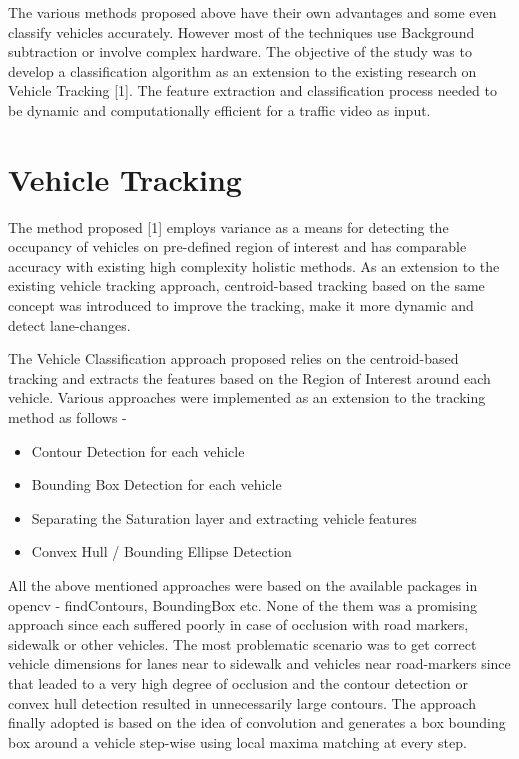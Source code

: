 \documentclass[a4paper,12pt]{article}
\begin{document}
\begin{flushleft}
	The various methods proposed above have their own advantages and some even classify vehicles accurately. However most of the techniques use Background subtraction or involve complex hardware. The objective of the study was to develop a classification algorithm as an extension to the existing research on Vehicle Tracking [1]. The feature extraction and classification process needed to be dynamic and computationally efficient for a traffic video as input.
\end{flushleft}


\newpage
\section{Vehicle Tracking}

\vspace{0.1in}
The method proposed [1] employs variance as a means for detecting the occupancy of vehicles on pre-defined region of interest and has comparable accuracy with existing high complexity holistic methods. As an extension to the existing vehicle tracking approach, centroid-based tracking based on the same concept was introduced to improve the tracking, make it more dynamic and detect lane-changes.

\vspace{0.1in}
\begin{flushleft}
The Vehicle Classification approach proposed relies on the centroid-based tracking and extracts the features based on the Region of Interest around each vehicle. Various approaches were implemented as an extension to the tracking method as follows - 
\end{flushleft}

\begin{itemize}
\setlength{\itemindent}{.2in}
\item Contour Detection for each vehicle
\item Bounding Box Detection for each vehicle
\item Separating the Saturation layer and extracting vehicle features
\item Convex Hull / Bounding Ellipse Detection
\end{itemize}
	
\begin{flushleft}
All the above mentioned approaches were based on the available packages in opencv - findContours, BoundingBox etc. None of the them was a promising approach since each suffered poorly in case of occlusion with road markers, sidewalk or other vehicles. The most problematic scenario was to get correct vehicle dimensions for lanes near to sidewalk and vehicles near road-markers since that leaded to a very high degree of occlusion and the contour detection or convex hull detection resulted in unnecessarily large contours. The approach finally adopted is based on the idea of convolution and generates a box bounding box around a vehicle step-wise using local maxima matching at every step. 
\end{flushleft}
\end{document}
